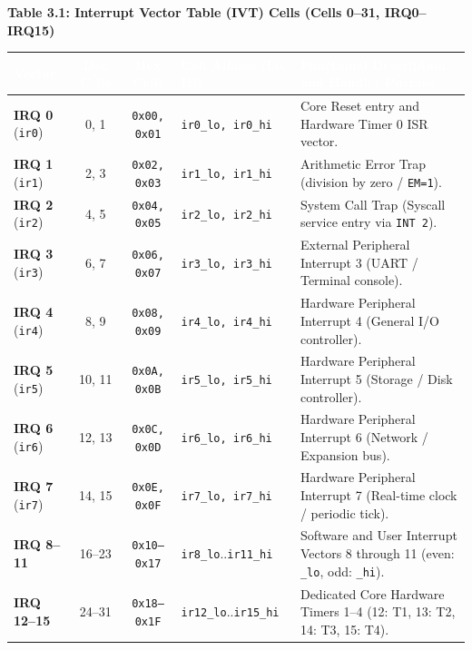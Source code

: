 \documentclass[11pt,a4paper]{article}
\renewcommand{\arraystretch}{1.25}
\begin{document}
\vspace{1.5mm}
\noindent\textbf{Table 3.1: Interrupt Vector Table (IVT) Cells (Cells 0--31, IRQ0--IRQ15)}
\par\vspace{1mm}\noindent
{\footnotesize
\renewcommand{\arraystretch}{0.93}
\begin{tabularx}{\textwidth}{@{} l c c l >{\raggedright\arraybackslash}X @{}}
\toprule
\rowcolor{limslate}
\textcolor{white}{\textbf{Vector}} & \textcolor{white}{\textbf{Dec Cells}} & \textcolor{white}{\textbf{Hex Cells}} & \textcolor{white}{\textbf{Cell Aliases (Lo, Hi)}} & \textcolor{white}{\textbf{Functional Description and Handler Purpose}} \\
\midrule
\rowcolors{2}{limroweven}{white}
\textbf{IRQ 0} (\texttt{ir0}) & 0, 1 & \texttt{0x00, 0x01} & \texttt{ir0\_lo, ir0\_hi} & Core Reset entry and Hardware Timer 0 ISR vector. \\
\textbf{IRQ 1} (\texttt{ir1}) & 2, 3 & \texttt{0x02, 0x03} & \texttt{ir1\_lo, ir1\_hi} & Arithmetic Error Trap (division by zero / \texttt{EM=1}). \\
\textbf{IRQ 2} (\texttt{ir2}) & 4, 5 & \texttt{0x04, 0x05} & \texttt{ir2\_lo, ir2\_hi} & System Call Trap (Syscall service entry via \texttt{INT 2}). \\
\textbf{IRQ 3} (\texttt{ir3}) & 6, 7 & \texttt{0x06, 0x07} & \texttt{ir3\_lo, ir3\_hi} & External Peripheral Interrupt 3 (UART / Terminal console). \\
\textbf{IRQ 4} (\texttt{ir4}) & 8, 9 & \texttt{0x08, 0x09} & \texttt{ir4\_lo, ir4\_hi} & Hardware Peripheral Interrupt 4 (General I/O controller). \\
\textbf{IRQ 5} (\texttt{ir5}) & 10, 11 & \texttt{0x0A, 0x0B} & \texttt{ir5\_lo, ir5\_hi} & Hardware Peripheral Interrupt 5 (Storage / Disk controller). \\
\textbf{IRQ 6} (\texttt{ir6}) & 12, 13 & \texttt{0x0C, 0x0D} & \texttt{ir6\_lo, ir6\_hi} & Hardware Peripheral Interrupt 6 (Network / Expansion bus). \\
\textbf{IRQ 7} (\texttt{ir7}) & 14, 15 & \texttt{0x0E, 0x0F} & \texttt{ir7\_lo, ir7\_hi} & Hardware Peripheral Interrupt 7 (Real-time clock / periodic tick). \\
\textbf{IRQ 8--11} & 16--23 & \texttt{0x10--0x17} & \texttt{ir8\_lo}..\texttt{ir11\_hi} & Software and User Interrupt Vectors 8 through 11 (even: \texttt{\_lo}, odd: \texttt{\_hi}). \\
\textbf{IRQ 12--15} & 24--31 & \texttt{0x18--0x1F} & \texttt{ir12\_lo}..\texttt{ir15\_hi} & Dedicated Core Hardware Timers 1--4 (12: T1, 13: T2, 14: T3, 15: T4). \\
\bottomrule
\end{tabularx}
}
\par\vspace{1.5mm}\par
\end{document}
